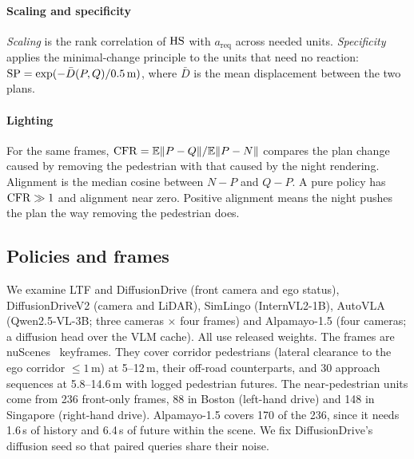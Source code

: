 \paragraph{Scaling and specificity}
\emph{Scaling} is the rank correlation of $\mathrm{HS}$ with $a_{\mathrm{req}}$ across needed units.
\emph{Specificity} applies the minimal-change principle to the units that need no reaction:
$\mathrm{SP}=\exp(-\bar D(P,Q)/0.5\,\mathrm{m})$, where $\bar D$ is the mean displacement between the two
plans.

\paragraph{Lighting}
For the same frames, $\mathrm{CFR}=\mathbb{E}\|P-Q\|/\mathbb{E}\|P-N\|$ compares the plan change caused by
removing the pedestrian with that caused by the night rendering. Alignment is the median cosine between
$N-P$ and $Q-P$. A pure policy has $\mathrm{CFR}\gg1$ and alignment near zero. Positive alignment means the
night pushes the plan the way removing the pedestrian does.

\subsection{Policies and frames}
We examine LTF and DiffusionDrive (front camera and ego status), DiffusionDriveV2 (camera and LiDAR),
SimLingo (InternVL2-1B), AutoVLA (Qwen2.5-VL-3B; three cameras $\times$ four frames) and Alpamayo-1.5
(four cameras; a diffusion head over the VLM cache). All use released weights. The frames are
nuScenes~\cite{caesar2020nuscenes} keyframes. They cover corridor pedestrians (lateral clearance to the
ego corridor $\le1$\,m) at 5--12\,m, their off-road counterparts, and 30 approach sequences at
5.8--14.6\,m with logged pedestrian futures. The near-pedestrian units come from 236 front-only
frames, 88 in Boston (left-hand drive) and 148 in Singapore (right-hand drive). Alpamayo-1.5 covers
170 of the 236, since it needs 1.6\,s of history and 6.4\,s of future within the scene. We fix
DiffusionDrive's diffusion seed so that paired queries share their noise.
